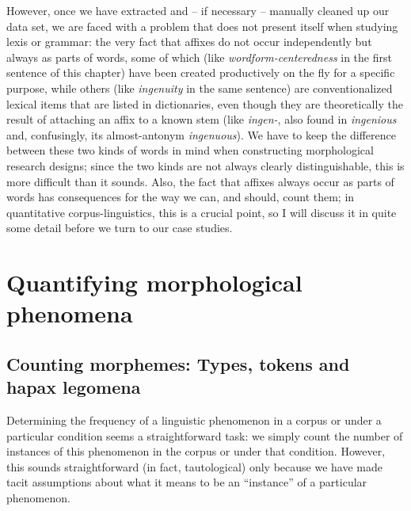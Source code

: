 However, once we have extracted  and -- if necessary -- manually  cleaned up our data set, we are faced with a problem that does not present itself when studying lexis or grammar:  the very fact that affixes  do not occur independently but always as parts of words, some of which (like \textit{wordform-centeredness} in the first sentence of this chapter) have been created productively  on the fly for a specific purpose, while others (like \textit{ingenuity} in the same sentence) are conventionalized  lexical items that are listed in dictionaries,  even though they are theoretically the result of attaching an affix  to a known stem  (like \textit{ingen-}, also found in \textit{ingenious} and, confusingly, its almost\hyp{}antonym  \textit{ingenuous}). We have to keep the difference between these two kinds of words in mind when constructing morphological  research designs;  since the two kinds are not always clearly distinguishable, this is more difficult than it sounds. Also, the fact that affixes  always occur as parts of words has consequences for the way we can, and should, count them; in quantitative  corpus\hyp{}linguistics, this is a crucial point, so I will discuss it in quite some detail before we turn to our case studies.

\section{Quantifying morphological phenomena}
\label{sec:quantifyingmorphologicalphenomena}

\subsection{Counting morphemes: Types, tokens and hapax legomena}
\label{sec:countingmorphemes}

Determining the frequency  of a linguistic phenomenon in a corpus or under a particular condition seems a straightforward task: we simply count the number of instances of this phenomenon in the corpus or under that condition. However, this sounds straightforward (in fact, tautological) only because we have made tacit assumptions about what it means to be an ``instance'' of a particular phenomenon.

